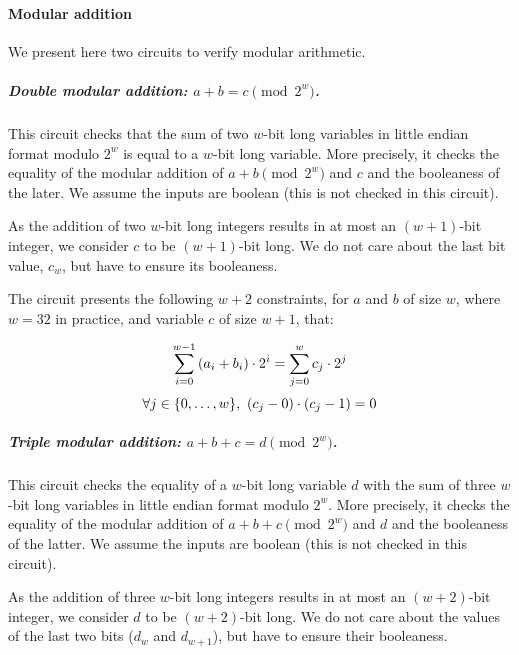 \paragraph{Modular addition}\label{implementation:efficiency:blake:helper-circuits:modular-addition}

We present here two circuits to verify modular arithmetic.

\subparagraph{Double modular addition: {\boldmath $a + b = c \pmod {2^w}$}.}

This circuit checks that the sum of two $w$-bit long variables in little endian format modulo ${2^w}$ is equal to a $w$-bit long variable. More precisely, it checks the equality of the modular addition of $a+b \pmod {2^w}$ and $c$ and the booleaness of the later. We assume the inputs are boolean (this is not checked in this circuit).

As the addition of two $w$-bit long integers results in at most an $(w + 1)$-bit integer, we consider $c$ to be $(w + 1)$-bit long. We do not care about the last bit value, $c_w$, but have to ensure its booleaness.

The circuit presents the following $w+2$ constraints, for $a$ and $b$ of size $w$, where $w=32$ in practice, and variable $c$ of size $w+1$, that:

\begin{equation}
  \label{implementation:eq:modular_sum}
  \sum_{i=0}^{w - 1} \left( a_i + b_i \right ) \cdot 2^i = \sum_{j=0}^{w} c_j \cdot 2^j\\
\end{equation}
\begin{equation}
  \label{implementation:eq:modular_bool}
  \forall j \in \{{0},\ldots,{w}\},\ (c_j - 0) \cdot (c_j - 1) = 0
\end{equation}

\subparagraph{Triple modular addition: {\boldmath $a + b + c = d \pmod {2^w}$}.}

This circuit checks the equality of a $w$-bit long variable $d$ with the sum of three $w$-bit long variables in little endian format modulo ${2^w}$. More precisely, it checks the equality of the modular addition of $a+b+c \pmod {2^w}$ and $d$ and the booleaness of the latter. We assume the inputs are boolean (this is not checked in this circuit).

As the addition of three $w$-bit long integers results in at most an $(w + 2)$-bit integer, we consider $d$ to be $(w + 2)$-bit long. We do not care about the values of the last two bits ($d_w$ and $d_{w+1}$), but have to ensure their booleaness.

